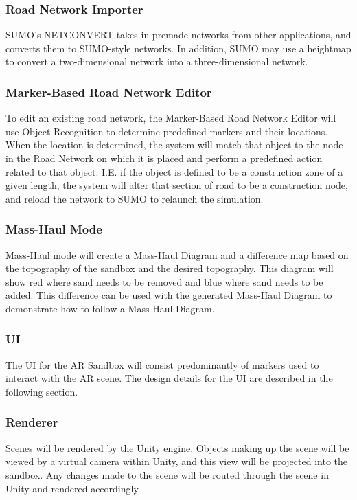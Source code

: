 \documentclass[letterpaper, 10pt, onecolumn, draftclsnofoot]{IEEEtran}
\begin{document}
        \subsubsection{Road Network Importer}
            SUMO's NETCONVERT takes in premade networks from other applications, and converts them to SUMO-style networks\cite{SUMO}. In addition, SUMO may use a heightmap to convert a two-dimensional network into a three-dimensional network. 
       
        \subsubsection{Marker-Based Road Network Editor}
            To edit an existing road network, the Marker-Based Road Network Editor will use Object Recognition to determine predefined markers and their locations. When the location is determined, the system will match that object to the node in the Road Network on which it is placed and perform a predefined action related to that object. I.E. if the object is defined to be a construction zone of a given length, the system will alter that section of road to be a construction node, and reload the network to SUMO to relaunch the simulation. 
        
        \subsubsection{Mass-Haul Mode}
            Mass-Haul mode will create a Mass-Haul Diagram and a difference map based on the topography of the sandbox and the desired topography. This diagram will show red where sand needs to be removed and blue where sand needs to be added. This difference can be used with the generated Mass-Haul Diagram to demonstrate how to follow a Mass-Haul Diagram. 
        
        \subsubsection{UI}
            The UI for the AR Sandbox will consist predominantly of markers used to interact with the AR scene. The design details for the UI are described in the following section.
        
        \subsubsection{Renderer}
            Scenes will be rendered by the Unity engine. Objects making up the scene will be viewed by a virtual camera within Unity, and this view will be projected into the sandbox. Any changes made to the scene will be routed through the scene in Unity and rendered accordingly.
            
\end{document}
